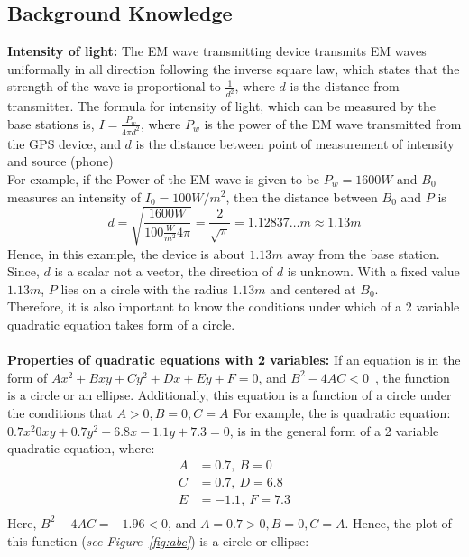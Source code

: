 \documentclass[a4paper,12pt]{article}
\begin{document}
\subsection{ Background Knowledge}
\textbf{Intensity of light:} The EM wave transmitting device transmits EM waves uniformally in all direction following the inverse square law, which states that the strength of the wave is proportional to $\frac{1}{d^2}$, where $d$ is the distance from transmitter. 
The formula for intensity of light, which can be measured by the base stations is, $I=\frac{P_w}{4\pi d^2}$, where $P_w$ is the power of the EM wave transmitted from the GPS device, 
and $d$ is the distance between point of measurement of intensity and source (phone)~\cite{2}
\\
For example, if the Power of the EM wave is given to be $P_w=1600W$ and $B_0$ measures an intensity of $I_0=100W/m^2$, then the distance between $B_0$ and $P$ is 
\begin{equation*}
    d=\sqrt{\frac{1600W}{100\frac{W}{m^2}4\pi}}= \frac{2}{\sqrt{\pi}}= 1.12837\dots m\approx 1.13m
\end{equation*}
Hence, in this example, the device is about $1.13m$ away from the base station. Since, $d$ is a scalar not a vector, the direction of $d$ is unknown. With a fixed value $1.13 m$, $P$ lies on a circle with the radius $1.13 m$ and centered at $B_0$.
\\
Therefore, it is also important to know the conditions under which of a 2 variable quadratic equation takes form of a circle.
\\\\
\textbf{Properties of quadratic equations with 2 variables:} If an equation is in the form of $Ax^2 +Bxy +Cy^2 +Dx +Ey +F = 0$, and $B^2-4AC<0$~\cite{1}, the function is a circle or an ellipse. Additionally, this equation is a function of a circle under the conditions that $A>0, B=0, C=A$ 
For example, the is quadratic equation: $0.7x^2 0xy +0.7y^2 + 6.8x - 1.1y + 7.3 = 0$, is in the general form of a 2 variable quadratic equation, where:
\begin{equation*}
    \begin{split}
        A&=0.7,~B=0\\
        C&=0.7,~D=6.8\\
        E&=-1.1,~F=7.3\\
    \end{split}
\end{equation*}
Here, $B^2-4AC=-1.96<0$, and $A=0.7>0, B=0, C=A$. Hence, the plot of this function (\textit{see Figure~\ref{fig:abc}}) is a circle or ellipse:
\end{document}
